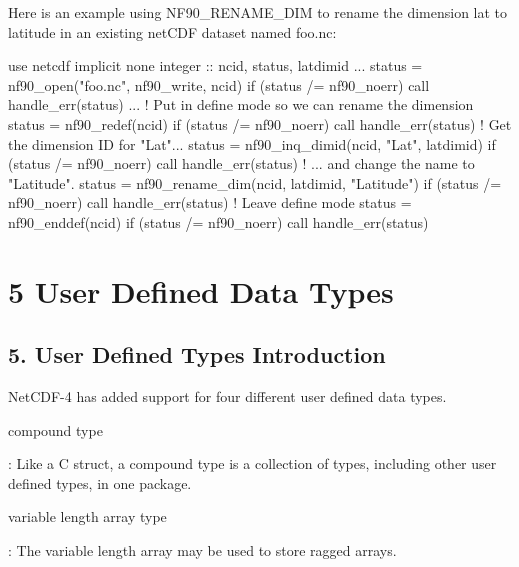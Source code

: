 Here is an example using N\+F90\+\_\+\+R\+E\+N\+A\+M\+E\+\_\+\+D\+IM to rename the dimension lat to latitude in an existing net\+C\+DF dataset named foo.\+nc\+:


\begin{DoxyCode}
\textcolor{keywordtype}{use }netcdf
\textcolor{keywordtype}{implicit none}
\textcolor{keywordtype}{integer} :: ncid, status, latdimid
...
status = nf90\_open(\textcolor{stringliteral}{"foo.nc"}, nf90\_write, ncid)
\textcolor{keywordflow}{if} (status /= nf90\_noerr) \textcolor{keyword}{call }handle\_err(status)
...
\textcolor{comment}{! Put in define mode so we can rename the dimension}
status = nf90\_redef(ncid)
\textcolor{keywordflow}{if} (status /= nf90\_noerr) \textcolor{keyword}{call }handle\_err(status)
\textcolor{comment}{! Get the dimension ID for "Lat"...}
status = nf90\_inq\_dimid(ncid, \textcolor{stringliteral}{"Lat"}, latdimid)
\textcolor{keywordflow}{if} (status /= nf90\_noerr) \textcolor{keyword}{call }handle\_err(status)
\textcolor{comment}{! ... and change the name to "Latitude".}
status = nf90\_rename\_dim(ncid, latdimid, \textcolor{stringliteral}{"Latitude"})
\textcolor{keywordflow}{if} (status /= nf90\_noerr) \textcolor{keyword}{call }handle\_err(status)
\textcolor{comment}{! Leave define mode}
status = nf90\_enddef(ncid)
\textcolor{keywordflow}{if} (status /= nf90\_noerr) \textcolor{keyword}{call }handle\_err(status)
\end{DoxyCode}
 \hypertarget{f90-user-defined-data-types}{}\section{5 User Defined Data Types}\label{f90-user-defined-data-types}
\hypertarget{f90-user-defined-data-types_f90-user-defined-types-introduction}{}\subsection{5. User Defined Types Introduction }\label{f90-user-defined-data-types_f90-user-defined-types-introduction}
Net\+C\+D\+F-\/4 has added support for four different user defined data types.

{\ttfamily compound type}

\+: Like a C struct, a compound type is a collection of types, including other user defined types, in one package.

{\ttfamily variable length array type}

\+: The variable length array may be used to store ragged arrays.

